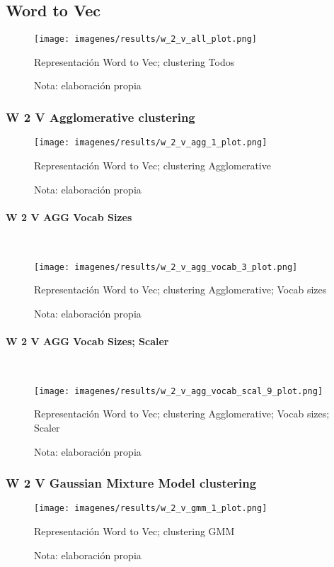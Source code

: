 \documentclass[12pt]{article}
\newcommand{\subsubsubsection}[1]{\paragraph{#1}\mbox{}\\}
\begin{document}
		\subsection{Word to Vec}
		\begin{figure}[H]
			\texttt{[image: imagenes/results/w\_2\_v\_all\_plot.png]}
			\centering
			\caption{Representación Word to Vec; clustering Todos}
			\caption*{\small Nota:  elaboración propia}
			\label{fig:w2v_all}
		\end{figure}
		
			\subsubsection{W 2 V Agglomerative clustering}									
			\begin{figure}[H]
				\texttt{[image: imagenes/results/w\_2\_v\_agg\_1\_plot.png]}
				\centering
				\caption{Representación Word to Vec; clustering Agglomerative}
				\caption*{\small Nota:  elaboración propia}
				\label{fig:w2v_agg_1}
			\end{figure}
			
				\subsubsubsection{W 2 V AGG Vocab Sizes}				
				\begin{figure}[H]
					\texttt{[image: imagenes/results/w\_2\_v\_agg\_vocab\_3\_plot.png]}
					\centering
					\caption{Representación Word to Vec; clustering Agglomerative; Vocab sizes}
					\caption*{\small Nota:  elaboración propia}
					\label{fig:w2v_agg_vocab_3}
				\end{figure}
							
				\subsubsubsection{W 2 V AGG Vocab Sizes; Scaler}				
				\begin{figure}[H]
					\texttt{[image: imagenes/results/w\_2\_v\_agg\_vocab\_scal\_9\_plot.png]}
					\centering
					\caption{Representación Word to Vec; clustering Agglomerative; Vocab sizes; Scaler}
					\caption*{\small Nota:  elaboración propia}
					\label{fig:w2v_agg_vocab_scal_9}
				\end{figure}
							
			\subsubsection{W 2 V Gaussian Mixture Model clustering}									
			\begin{figure}[H]
				\texttt{[image: imagenes/results/w\_2\_v\_gmm\_1\_plot.png]}
				\centering
				\caption{Representación Word to Vec; clustering GMM}
				\caption*{\small Nota:  elaboración propia}
				\label{fig:w2v_gmm_1}
			\end{figure}
			
\end{document}
